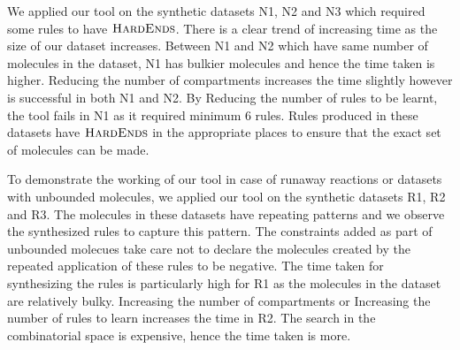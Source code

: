 \documentclass{llncs}
\begin{document}
 We applied our tool on the synthetic datasets N1, N2 and N3 which required some rules to have $\textsc{HardEnds}$. There is a clear trend of increasing time as the size of our dataset increases. Between N1 and N2 which have same number of molecules in the dataset, N1 has bulkier molecules and hence the time taken is higher. Reducing the number of compartments increases the time slightly however is successful in both N1 and N2. By Reducing the number of rules to be learnt, the tool fails in N1 as it required minimum 6 rules. Rules produced in these datasets have $\textsc{HardEnds}$ in the appropriate places to ensure that the exact set of molecules can be made.

  To demonstrate the working of our tool in case of runaway reactions or datasets with unbounded molecules, we applied our tool on the synthetic datasets R1, R2 and R3. The molecules in these datasets have repeating patterns and we observe the synthesized rules to capture this pattern. The constraints added as part of unbounded molecues take care not to declare the molecules created by the repeated application of these rules to be negative. The time taken for synthesizing the rules is particularly high for R1 as the molecules in the dataset are relatively bulky. Increasing the number of compartments or Increasing the number of rules to learn increases the time in R2. The search in the combinatorial space is expensive, hence the time taken is more. 
% 
\end{document}

